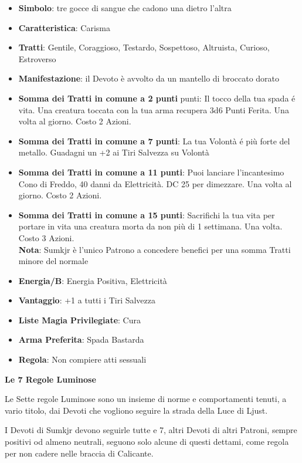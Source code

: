 \begin{multicols}{2}
\begin{itemize}[leftmargin=*] \setlength{\itemsep}{0pt}
\item \textbf{Simbolo}: tre gocce di sangue che cadono una dietro l'altra
\item \textbf{Caratteristica}: Carisma
\item \textbf{Tratti}: Gentile, Coraggioso, Testardo, Sospettoso, Altruista, Curioso, Estroverso
\item \textbf{Manifestazione}: il Devoto è avvolto da un mantello di broccato dorato
\item \textbf{Somma dei Tratti in comune a 2 punti} punti: Il tocco della tua spada é vita. Una creatura toccata con la tua arma recupera 3d6 Punti Ferita. Una volta al giorno. Costo 2 Azioni.
\item \textbf{Somma dei Tratti in comune a 7 punti}: La tua Volontà é più forte del metallo. Guadagni un +2 ai Tiri Salvezza su Volontà
\item \textbf{Somma dei Tratti in comune a 11 punti}: Puoi lanciare l'incantesimo Cono di Freddo, 40 danni da Elettricità. DC 25 per dimezzare. Una volta al giorno. Costo 2 Azioni.
\item \textbf{Somma dei Tratti in comune a 15 punti}: Sacrifichi la tua vita per portare in vita una creatura morta da non più di 1 settimana. Una volta. Costo 3 Azioni.\\
\textbf{Nota}: Sumkjr è l'unico Patrono a concedere benefici per una somma Tratti minore del normale
\item \textbf{Energia/B}: Energia Positiva, Elettricità
\item \textbf{Vantaggio}: +1 a tutti i Tiri Salvezza
\item \textbf{Liste Magia Privilegiate}: Cura
\item \textbf{Arma Preferita}: Spada Bastarda
\item \textbf{Regola}: Non compiere atti sessuali
\end{itemize}

\textbf{Le 7 Regole Luminose}

Le Sette regole Luminose sono un insieme di norme e comportamenti tenuti, a vario titolo, dai Devoti che vogliono seguire la strada della Luce di Ljust.

I Devoti di Sumkjr devono seguirle tutte e 7, altri Devoti di altri Patroni, sempre positivi od almeno neutrali, seguono solo alcune di questi dettami, come regola per non cadere nelle braccia di Calicante.


\end{multicols}
